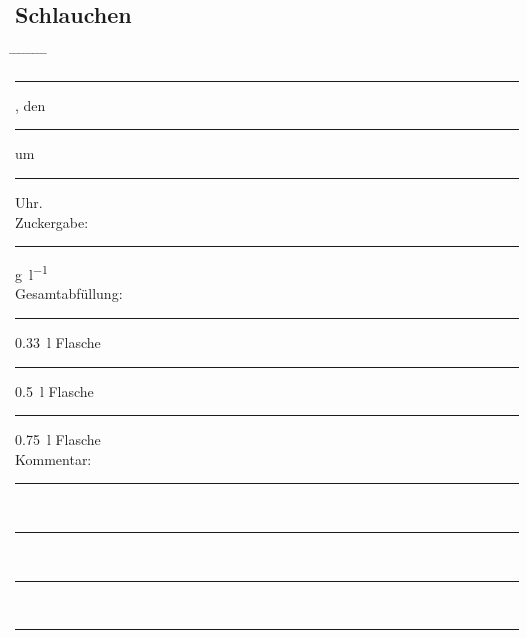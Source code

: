 \documentclass[12pt,oneside,a4paper]{scrartcl}
\newcommand{\Zeitluecke}{\rule[-0.1cm]{1.8cm}{0.5pt}}
\begin{document}
{\subsection*{Schlauchen}
	\begin{tabbing}
		\hspace{1cm} \= \hspace{1cm} \= \hspace{1cm} \= \hspace{1cm} \= \hspace{1cm} \= \hspace{1cm} \= \hspace{1cm} \= \hspace{1cm} \= \kill
		\> \rule[-0.1cm]{4cm}{0.5pt}, den \rule[-0.1cm]{4cm}{0.5pt} um \Zeitluecke Uhr.\\
		\> Zuckergabe: \>\>\>\>\rule[-0.1cm]{1cm}{0.5pt} \>\si{\gram\per\litre}\\
		\> Gesamtabfüllung: \> \> \> \> \rule[-0.1cm]{1cm}{0.5pt}\> \SI{0,33}{\litre} \>Flasche\\
		\> \> \> \> \>\rule[-0.1cm]{1cm}{0.5pt} \> \SI{0,5}{\litre} \>Flasche\\
		\> \> \> \> \> \rule[-0.1cm]{1cm}{0.5pt}\> \SI{0,75}{\litre} \>Flasche\\
		\> Kommentar: \>\>\> \rule[-0.1cm]{13cm}{0.5pt}\\
		\> \>  \rule[-0.1cm]{15.3cm}{0.5pt}\\
		\> \>  \rule[-0.1cm]{15.3cm}{0.5pt}\\
		\> \>  \rule[-0.1cm]{15.3cm}{0.5pt}		
	\end{tabbing}
%
}
\end{document}
